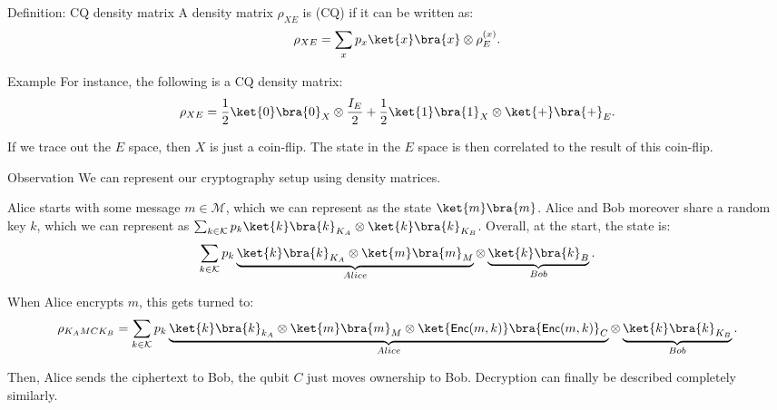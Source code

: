 \documentclass[a4paper]{article}
\begin{document}
\begin{parag}{Definition: CQ density matrix}
    A density matrix $\rho_{XE}$ is  (CQ) if it can be written as: 
    \[\rho_{XE} = \sum_{x} p_x \ket{x}\bra{x} \otimes \rho_E^{\left(x\right)}.\]

    \begin{subparag}{Example}
        For instance, the following is a CQ density matrix: 
        \[\rho_{XE} = \frac{1}{2} \ket{0}\bra{0}_X \otimes \frac{I_E}{2} + \frac{1}{2} \ket{1}\bra{1}_X \otimes \ket{+}\bra{+}_E.\]
        
        If we trace out the $E$ space, then $X$ is just a coin-flip. The state in the $E$ space is then correlated to the result of this coin-flip.
    \end{subparag}
\end{parag}

\begin{parag}{Observation}
    We can represent our cryptography setup using density matrices.

    Alice starts with some message $m \in \mathcal{M}$, which we can represent as the state $\ket{m}\bra{m}$. Alice and Bob moreover  share a random key $k$, which we can represent as $\sum_{k \in \mathcal{K}} p_k \ket{k}\bra{k}_{K_A} \otimes \ket{k}\bra{k}_{K_B}$. Overall, at the start, the state is: 
    \[\sum_{k \in \mathcal{K}} p_k \underbrace{\ket{k}\bra{k}_{K_A} \otimes \ket{m}\bra{m}_{M}}_{Alice} \otimes \underbrace{\ket{k}\bra{k}_B}_{Bob}.\]

    When Alice encrypts $m$, this gets turned to: 
    \[\rho_{K_A M C K_B} = \sum_{k \in \mathcal{K}} p_k \underbrace{\ket{k}\bra{k}_{k_A} \otimes \ket{m}\bra{m}_{M} \otimes \ket{\lang{Enc}\left(m, k\right)}\bra{\lang{Enc}\left(m, k\right)}_{C}}_{Alice} \otimes \underbrace{\ket{k}\bra{k}_{K_B}}_{Bob}.\]

    Then, Alice sends the ciphertext to Bob, the qubit $C$ just moves ownership to Bob. Decryption can finally be described completely similarly.
\end{parag}
\end{document}
